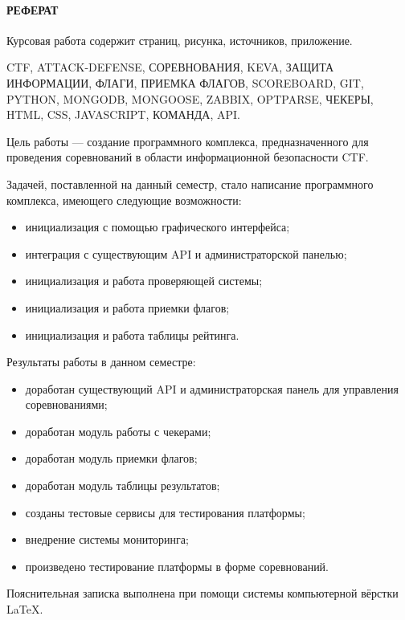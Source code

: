 \newpage
{}
\paragraph{\hfill РЕФЕРАТ \hfill}

Курсовая работа содержит  страниц,  рисунка,  источников,  приложение.

CTF, ATTACK-DEFENSE, СОРЕВНОВАНИЯ, KEVA, ЗАЩИТА ИНФОРМАЦИИ, ФЛАГИ, ПРИЕМКА ФЛАГОВ, SCOREBOARD, GIT, PYTHON, MONGODB, MONGOOSE, ZABBIX, OPTPARSE, ЧЕКЕРЫ, HTML, CSS, JAVASCRIPT, КОМАНДА, API.

Цель работы --- создание программного комплекса, предназначенного для проведения соревнований в области информационной безопасности CTF.

Задачей, поставленной на данный семестр, стало написание программного комплекса, имеющего следующие возможности: 
\begin{itemize}
\item инициализация с помощью графического интерфейса;
\item интеграция с существующим API и администраторской панелью; 
\item инициализация и работа проверяющей системы;
\item инициализация и работа приемки флагов;
\item инициализация и работа таблицы рейтинга.
\end{itemize}

Результаты работы в данном семестре:

\begin{itemize}
\item доработан существующий API и администраторская панель для управления соревнованиями; 
\item доработан модуль работы с чекерами;
\item доработан модуль приемки флагов;
\item доработан модуль таблицы результатов;
\item созданы тестовые сервисы для тестирования платформы;
\item внедрение системы мониторинга;
\item произведено тестирование платформы в форме соревнований.
\end{itemize}

Пояснительная записка выполнена при помощи системы компьютерной вёрстки \LaTeX.
